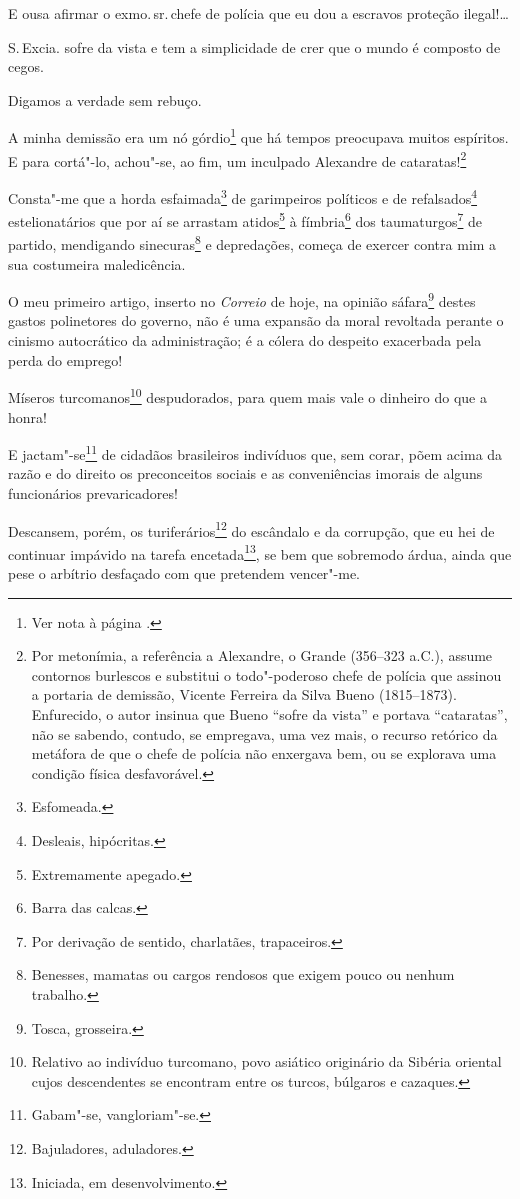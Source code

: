 E ousa afirmar o exmo.\,sr.\,chefe de polícia que eu dou a escravos
proteção ilegal!\ldots{}

S.\,Excia. sofre da vista e tem a simplicidade de crer que o mundo é
composto de cegos.

Digamos a verdade sem rebuço.

A minha demissão era um nó górdio\footnote{Ver nota à página \pageref{gordio}.} que há tempos preocupava muitos
espíritos. E para cortá"-lo, achou"-se, ao fim, um inculpado Alexandre de
cataratas!\footnote{Por metonímia, a referência a Alexandre, o Grande
  (356--323 a.C.), assume contornos burlescos e substitui o todo"-poderoso
  chefe de polícia que assinou a portaria de demissão, Vicente Ferreira
  da Silva Bueno (1815--1873). Enfurecido, o autor insinua que Bueno
  ``sofre da vista'' e portava ``cataratas'', não se sabendo, contudo, se
  empregava, uma vez mais, o recurso retórico da metáfora de que o chefe
  de polícia não enxergava bem, ou se explorava uma condição física
  desfavorável.}

Consta"-me que a horda esfaimada\footnote{Esfomeada.} de garimpeiros
políticos e de refalsados\footnote{Desleais, hipócritas.}
estelionatários que por aí se arrastam atidos\footnote{Extremamente
  apegado.} à fímbria\footnote{Barra das calcas.} dos
taumaturgos\footnote{Por derivação de sentido, charlatães,
  trapaceiros.} de partido, mendigando sinecuras\footnote{Benesses,
  mamatas ou cargos rendosos que exigem pouco ou nenhum trabalho.} e
depredações, começa de exercer contra mim a sua costumeira maledicência.

O meu primeiro artigo, inserto no \emph{Correio} de hoje, na opinião
sáfara\footnote{Tosca, grosseira.} destes gastos polinetores do
governo, não é uma expansão da moral revoltada perante o cinismo
autocrático da administração; é a cólera do despeito exacerbada pela
perda do emprego!

Míseros turcomanos\footnote{Relativo ao indivíduo turcomano, povo
  asiático originário da Sibéria oriental cujos descendentes se
  encontram entre os turcos, búlgaros e cazaques.} despudorados, para
quem mais vale o dinheiro do que a honra!

E jactam"-se\footnote{Gabam"-se, vangloriam"-se.} de cidadãos brasileiros
indivíduos que, sem corar, põem acima da razão e do direito os
preconceitos sociais e as conveniências imorais de alguns funcionários
prevaricadores!

Descansem, porém, os turiferários\footnote{Bajuladores, aduladores.}
do escândalo e da corrupção, que eu hei de continuar impávido na tarefa
encetada\footnote{Iniciada, em desenvolvimento.}, se bem que sobremodo
árdua, ainda que pese o arbítrio desfaçado com que pretendem vencer"-me.

